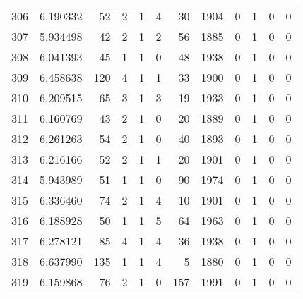 \begin{tabular}{lrrrrrrrrrrr}
306 &  6.190332 &   52 &      2 &        1 &      4 &              30 &  1904 &               0 &               1 &               0 &               0 \\
307 &  5.934498 &   42 &      2 &        1 &      2 &              56 &  1885 &               0 &               1 &               0 &               0 \\
308 &  6.041393 &   45 &      1 &        1 &      0 &              48 &  1938 &               0 &               1 &               0 &               0 \\
309 &  6.458638 &  120 &      4 &        1 &      1 &              33 &  1900 &               0 &               1 &               0 &               0 \\
310 &  6.209515 &   65 &      3 &        1 &      3 &              19 &  1933 &               0 &               1 &               0 &               0 \\
311 &  6.160769 &   43 &      2 &        1 &      0 &              20 &  1889 &               0 &               1 &               0 &               0 \\
312 &  6.261263 &   54 &      2 &        1 &      0 &              40 &  1893 &               0 &               1 &               0 &               0 \\
313 &  6.216166 &   52 &      2 &        1 &      1 &              20 &  1901 &               0 &               1 &               0 &               0 \\
314 &  5.943989 &   51 &      1 &        1 &      0 &              90 &  1974 &               0 &               1 &               0 &               0 \\
315 &  6.336460 &   74 &      2 &        1 &      4 &              10 &  1901 &               0 &               1 &               0 &               0 \\
316 &  6.188928 &   50 &      1 &        1 &      5 &              64 &  1963 &               0 &               1 &               0 &               0 \\
317 &  6.278121 &   85 &      4 &        1 &      4 &              36 &  1938 &               0 &               1 &               0 &               0 \\
318 &  6.637990 &  135 &      1 &        1 &      4 &               5 &  1880 &               0 &               1 &               0 &               0 \\
319 &  6.159868 &   76 &      2 &        1 &      0 &             157 &  1991 &               0 &               1 &               0 &               0 \\

\end{tabular}

